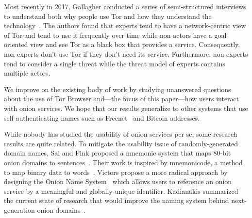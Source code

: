 Most recently in 2017, Gallagher \ea conducted a series of semi-structured
interviews to understand both why people use Tor and how they understand the
technology~\cite{Gallagher2017a}.  The authors found that experts tend to have a
network-centric view of Tor and tend to use it frequently over time while
non-actors have a goal-oriented view and see Tor as a black box that provides a
service.  Consequently, non-experts don't use Tor if they don't need its
service.  Furthermore, non-experts tend to consider a single threat while the
threat model of experts contains multiple actors.

We improve on the existing body of work by studying unanswered questions about
the use of Tor Browser and---the focus of this paper---how users interact with
onion services.  We hope that our results generalize to other systems that use
self-authenticating names such as Freenet~\cite{Freenet} and Bitcoin addresses.

While nobody has studied the usability of onion services per se, some research
results are quite related.  To mitigate the usability issue of
randomly-generated domain names, Sai and Fink proposed a mnemonic system that
maps 80-bit onion domains to sentences~\cite{Sai2012a}.  Their work is inspired
by mnemonicode, a method to map binary data to words~\cite{mnemonicode}.
Victors \ea propose a more radical approach by designing the Onion Name
System~\cite{Victors2017a} which allows users to reference an onion service by a
meaningful and globally-unique identifier.  Kadianakis summarized the current
state of research that would improve the naming system behind next-generation
onion domains~\cite{Kadianakis2017a}.
